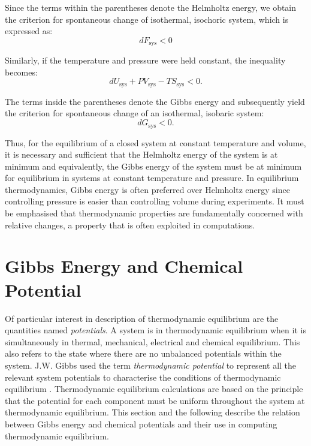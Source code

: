 		Since the terms within the parentheses denote the Helmholtz energy, we obtain the criterion for spontaneous change of isothermal, isochoric system, which is expressed as:
		\begin{equation}
			d{F_\text{sys} } < 0
		\end{equation}

		Similarly, if the temperature and pressure were held constant, the inequality becomes:
		\begin{equation}
			d{U_\text{sys} + PV_\text{sys} - TS_\text{sys} } < 0.
		\end{equation}

		The terms inside the parentheses denote the Gibbs energy and subsequently yield the criterion for spontaneous change of an isothermal, isobaric system:
		\begin{equation}
			d{G_\text{sys} } < 0.
		\end{equation}

		Thus, for the equilibrium of a closed system at constant temperature and volume, it is necessary and sufficient that the Helmholtz energy of the system is at minimum and equivalently, the Gibbs energy of the system must be at minimum for equilibrium in systems at constant temperature and pressure. In equilibrium thermodynamics, Gibbs energy is often preferred over Helmholtz energy since controlling pressure is easier than controlling volume during experiments. It must be emphasised that thermodynamic properties are fundamentally concerned with relative changes, a property that is often exploited in computations.

\section{Gibbs Energy and Chemical Potential}
	Of particular interest in description of  thermodynamic equilibrium are the quantities named \emph{potentials}. A system is in thermodynamic equilibrium when it is simultaneously in thermal, mechanical, electrical and chemical equilibrium. This also refers to the state where there are no unbalanced potentials within the system. J.W. Gibbs used the term \emph{thermodynamic potential} to represent all the relevant system potentials to characterise the conditions of thermodynamic equilibrium \cite{Gibbs:1878aa}. Thermodynamic equilibrium calculations are based on the principle that the potential for each component must be uniform throughout the system at thermodynamic equilibrium. This section and the following describe the relation between Gibbs energy and chemical potentials and their use in computing thermodynamic equilibrium.

